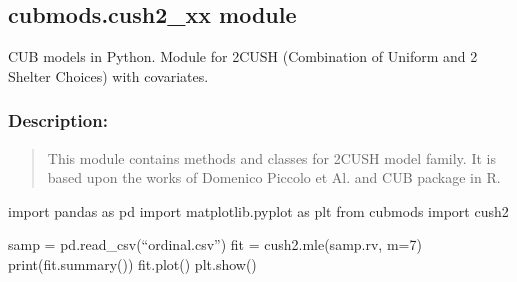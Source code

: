 \documentclass[letterpaper,10pt,english]{sphinxmanual}
\begin{document}
\subsection{cubmods.cush2\_xx module}
\label{\detokenize{cubmods:module-cubmods.cush2_xx}}\label{\detokenize{cubmods:cubmods-cush2-xx-module}}
\sphinxAtStartPar
CUB models in Python.
Module for 2\sphinxhyphen{}CUSH (Combination of Uniform
and 2 Shelter Choices) with covariates.


\subsubsection{Description:}
\label{\detokenize{cubmods:id200}}\begin{quote}

\sphinxAtStartPar
This module contains methods and classes
for 2\sphinxhyphen{}CUSH model family.
It is based upon the works of Domenico
Piccolo et Al. and CUB package in R.
\end{quote}
\begin{description}
\sphinxAtStartPar
import pandas as pd
import matplotlib.pyplot as plt
from cubmods import cush2

\sphinxAtStartPar
samp = pd.read\_csv(“ordinal.csv”)
fit = cush2.mle(samp.rv, m=7)
print(fit.summary())
fit.plot()
plt.show()

\end{description}
\end{document}
